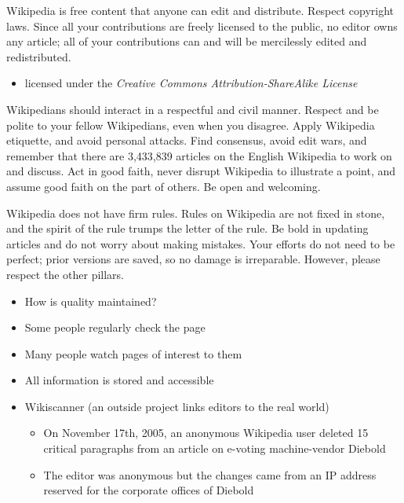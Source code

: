 \documentclass[a4paper,landscape,headrule,footrule,xetex]{foils}
\begin{document}

\begin{large}
  Wikipedia is free content that anyone can edit and
  distribute. Respect copyright laws. Since all your contributions are
  freely licensed to the public, no editor owns any article; all of
  your contributions can and will be mercilessly edited and
  redistributed.
\end{large}

\begin{itemize}
\item licensed under the \textit{Creative Commons Attribution-ShareAlike License}
\end{itemize}



\begin{large}
  Wikipedians should interact in a respectful and civil
  manner. Respect and be polite to your fellow Wikipedians, even when
  you disagree. Apply Wikipedia etiquette, and avoid personal
  attacks. Find consensus, avoid edit wars, and remember that there
  are 3,433,839 articles on the English Wikipedia to work on and
  discuss. Act in good faith, never disrupt Wikipedia to illustrate a
  point, and assume good faith on the part of others. Be open and
  welcoming.
\end{large}


\begin{large}
  Wikipedia does not have firm rules. Rules on Wikipedia are not fixed
  in stone, and the spirit of the rule trumps the letter of the
  rule. Be bold in updating articles and do not worry about making
  mistakes. Your efforts do not need to be perfect; prior versions are
  saved, so no damage is irreparable. However, please respect the
  other pillars.
\end{large}


\MyLogo{}
\begin{itemize}
\item How is quality maintained?
\item Some people regularly check the  page
\item Many people watch pages of interest to them
\item All information is stored and accessible
\item Wikiscanner (an outside project links editors to the real world)
  \begin{itemize}
  \item On November 17th, 2005, an anonymous Wikipedia user deleted 15 critical 
    paragraphs from an article on e-voting machine-vendor Diebold
  \item The editor was anonymous but the changes came from an IP
    address reserved for the corporate offices of Diebold
  \end{itemize}
\end{itemize}
\end{document}
